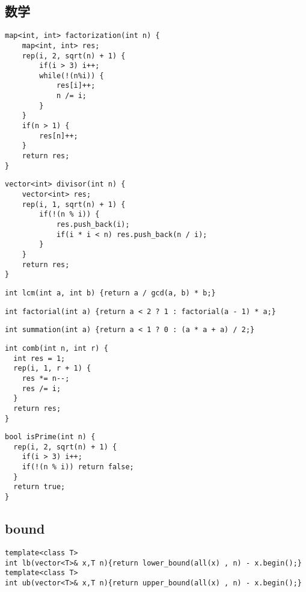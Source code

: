 \documentclass{jsarticle}
\begin{document}
\subsection*{数学}
\begin{lstlisting}[caption=素因数分解]
map<int, int> factorization(int n) {
    map<int, int> res;
    rep(i, 2, sqrt(n) + 1) {
        if(i > 3) i++;
        while(!(n%i)) {
            res[i]++;
            n /= i;
        }
    }
    if(n > 1) {
        res[n]++;
    }
    return res;
}
\end{lstlisting}
\begin{lstlisting}[caption=約数列挙]
vector<int> divisor(int n) {
    vector<int> res;
    rep(i, 1, sqrt(n) + 1) {
        if(!(n % i)) {
            res.push_back(i);
            if(i * i < n) res.push_back(n / i);
        }
    }
    return res;
}
\end{lstlisting}
\begin{lstlisting}[caption=最小公倍数]
int lcm(int a, int b) {return a / gcd(a, b) * b;}
\end{lstlisting}
\begin{lstlisting}[caption=累乗]
int factorial(int a) {return a < 2 ? 1 : factorial(a - 1) * a;}
\end{lstlisting}
\begin{lstlisting}[caption=総和]
int summation(int a) {return a < 1 ? 0 : (a * a + a) / 2;}
\end{lstlisting}
\begin{lstlisting}[caption=組み合わせ]
int comb(int n, int r) {
  int res = 1;
  rep(i, 1, r + 1) {
    res *= n--;
    res /= i;
  }
  return res;
}
\end{lstlisting}
\begin{lstlisting}[caption=素数判定]
bool isPrime(int n) {
  rep(i, 2, sqrt(n) + 1) {
    if(i > 3) i++;
    if(!(n % i)) return false;
  }
  return true;
}
\end{lstlisting}

\subsection*{bound}
\begin{lstlisting}[caption=bound]
template<class T>
int lb(vector<T>& x,T n){return lower_bound(all(x) , n) - x.begin();}
template<class T>
int ub(vector<T>& x,T n){return upper_bound(all(x) , n) - x.begin();}
\end{lstlisting}
\end{document}
